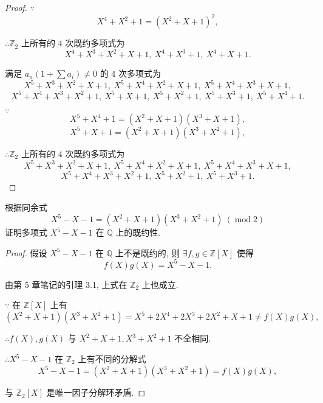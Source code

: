 \documentclass[UTF8]{ctexart}
\begin{document}
\begin{proof}
    $\because$
    \[X^4+X^2+1=(X^2+X+1)^2,\]

    $\therefore\mathbb{Z}_2$ 上所有的 $4$ 次既约多项式为
    \[X^4+X^3+X^2+X+1,\ X^4+X^3+1,\ X^4+X+1.\]

    满足 $a_n(1+\sum a_i)\neq0$ 的 4 次多项式为
    \[X^5+X^3+X^2+X+1,\ X^5+X^4+X^2+X+1,\ X^5+X^4+X^3+X+1,\]
    \[X^5+X^4+X^3+X^2+1,\ X^5+X+1,\ X^5+X^2+1,\ X^5+X^3+1,\ X^5+X^4+1.\]

    $\because$
    \[X^5+X^4+1=(X^2+X+1)(X^3+X+1),\]
    \[X^5+X+1=(X^2+X+1)(X^3+X^2+1),\]

    $\therefore\mathbb{Z}_2$ 上所有的 $4$ 次既约多项式为
    \[X^5+X^3+X^2+X+1,\ X^5+X^4+X^2+X+1,\ X^5+X^4+X^3+X+1,\]
    \[X^5+X^4+X^3+X^2+1,\ X^5+X^2+1,\ X^5+X^3+1.\]
\end{proof}
\begin{exercise}%
    根据同余式
    \[X^5-X-1=(X^2+X+1)(X^3+X^2+1)\ (\operatorname{mod}2)\]
    证明多项式 $X^5-X-1$ 在 $\mathbb{Q}$ 上的既约性.
\end{exercise}
\begin{proof}
    假设 $X^5-X-1$ 在 $\mathbb{Q}$ 上不是既约的, 则 $\exists f,g\in\mathbb{Z}[X]$ 使得
    \[f(X)g(X)=X^5-X-1.\]

    由第 5 章笔记的引理 3.1, 上式在 $\mathbb{Z}_2$ 上也成立.
    
    $\because$ 在 $\mathbb{Z}[X]$ 上有
    \[(X^2+X+1)(X^3+X^2+1)=X^5+2X^4+2X^3+2X^2+X+1\neq f(X)g(X),\]

    $\therefore f(X),g(X)$ 与 $X^2+X+1,X^3+X^2+1$ 不全相同.

    $\therefore X^5-X-1$ 在 $\mathbb{Z}_2$ 上有不同的分解式
    \[X^5-X-1=(X^2+X+1)(X^3+X^2+1)=f(X)g(X),\]

    与 $\mathbb{Z}_2[X]$ 是唯一因子分解环矛盾.
\end{proof}
\end{document}
